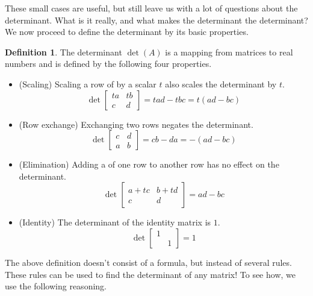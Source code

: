 \documentclass[11pt,oneside]{amsbook}
\theoremstyle{definition}
\theoremstyle{plain}
\theoremstyle{definition}
\newtheorem{definition}[theorem]{Definition}
\theoremstyle{remark}
\numberwithin{equation}{section}
\numberwithin{figure}{section}
\begin{document}
These small cases are useful, but still leave us with a lot of questions about the determinant. What is it really, and what makes the determinant the determinant? We now proceed to define the determinant by its basic properties.

\begin{definition}
  The determinant $\det(A)$ is a mapping from matrices to real numbers and is defined by the following four properties.
  \begin{itemize}
    \item (Scaling) Scaling a row of by a scalar $t$ also scales the determinant by $t$.
    \[\det\begin{bmatrix}ta&tb\\c&d\end{bmatrix}
      =tad-tbc=t(ad-bc)
    \]
    \item (Row exchange) Exchanging two rows negates the determinant.
    \[\det\begin{bmatrix}c&d\\a&b\end{bmatrix}
      =cb-da=-(ad-bc)
    \]
    \item (Elimination) Adding a of one row to another row has no effect on the determinant.
    \[\det\begin{bmatrix}a+tc&b+td\\c&d\end{bmatrix}
      =ad-bc
    \]
    \item (Identity) The determinant of the identity matrix is $1$.
    \[\det\begin{bmatrix}1\\&1\end{bmatrix}=1
    \]
  \end{itemize}
\end{definition}

The above definition doesn't consist of a formula, but instead of several rules. These rules can be used to find the determinant of any matrix! To see how, we use the following reasoning.
\end{document}
